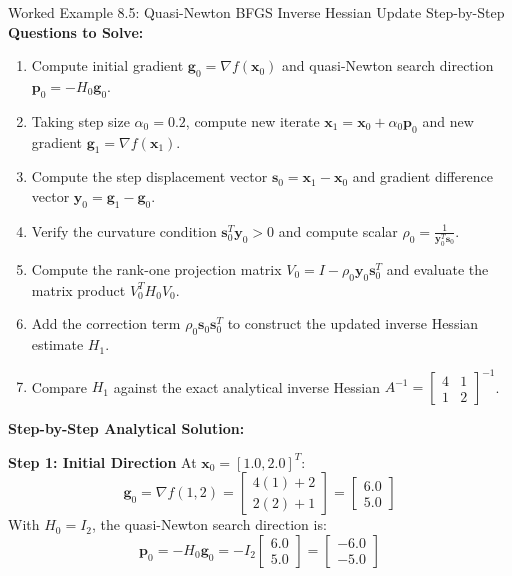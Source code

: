 \begin{examplebox}[breakable]{Worked Example 8.5: Quasi-Newton BFGS Inverse Hessian Update Step-by-Step}
\textbf{Questions to Solve:}
\begin{enumerate}
    \item Compute initial gradient $\mathbf{g}_0 = \nabla f(\mathbf{x}_0)$ and quasi-Newton search direction $\mathbf{p}_0 = -H_0 \mathbf{g}_0$.
    \item Taking step size $\alpha_0 = 0.2$, compute new iterate $\mathbf{x}_1 = \mathbf{x}_0 + \alpha_0 \mathbf{p}_0$ and new gradient $\mathbf{g}_1 = \nabla f(\mathbf{x}_1)$.
    \item Compute the step displacement vector $\mathbf{s}_0 = \mathbf{x}_1 - \mathbf{x}_0$ and gradient difference vector $\mathbf{y}_0 = \mathbf{g}_1 - \mathbf{g}_0$.
    \item Verify the curvature condition $\mathbf{s}_0^T \mathbf{y}_0 > 0$ and compute scalar $\rho_0 = \frac{1}{\mathbf{y}_0^T \mathbf{s}_0}$.
    \item Compute the rank-one projection matrix $V_0 = I - \rho_0 \mathbf{y}_0 \mathbf{s}_0^T$ and evaluate the matrix product $V_0^T H_0 V_0$.
    \item Add the correction term $\rho_0 \mathbf{s}_0 \mathbf{s}_0^T$ to construct the updated inverse Hessian estimate $H_1$.
    \item Compare $H_1$ against the exact analytical inverse Hessian $A^{-1} = \begin{bmatrix} 4 & 1 \\ 1 & 2 \end{bmatrix}^{-1}$.
\end{enumerate}

\tcblower
\textbf{Step-by-Step Analytical Solution:}

\textbf{Step 1: Initial Direction}
At $\mathbf{x}_0 = [1.0, 2.0]^T$:
\begin{equation*}
\mathbf{g}_0 = \nabla f(1, 2) = \begin{bmatrix} 4(1) + 2 \\ 2(2) + 1 \end{bmatrix} = \begin{bmatrix} 6.0 \\ 5.0 \end{bmatrix}
\end{equation*}
With $H_0 = I_2$, the quasi-Newton search direction is:
\begin{equation*}
\mathbf{p}_0 = -H_0 \mathbf{g}_0 = -I_2 \begin{bmatrix} 6.0 \\ 5.0 \end{bmatrix} = \begin{bmatrix} -6.0 \\ -5.0 \end{bmatrix}
\end{equation*}


\end{examplebox}

